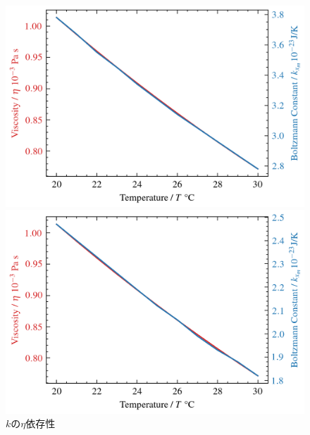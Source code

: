 \begin{figure}[htbp]
    \centering
    \begin{minipage}[b]{0.45\linewidth}
        \centering
        \includegraphics[keepaspectratio, width=\linewidth]{src/figures/k-n-relation/k-x-n-relation.png}
    \end{minipage}
    \begin{minipage}[b]{0.45\linewidth}
        \centering
        \includegraphics[width=\linewidth]{src/figures/k-n-relation/k-y-n-relation.png}
    \end{minipage}
    \caption{$k$の$\eta$依存性} \label{fig:k-n-relation}
\end{figure}
